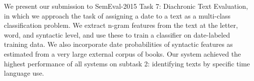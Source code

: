 We present our submission to SemEval-2015 Task 7: Diachronic Text Evaluation, in which we approach the task of assigning a date to a text as a multi-class classification problem. We extract n-gram features from the text at the letter, word, and syntactic level, and use these to train a classifier on date-labeled training data. We also incorporate date probabilities of syntactic features as estimated from a very large external corpus of books. Our system achieved the highest performance of all systems on subtask 2: identifying texts by specific time language use.

